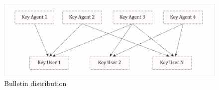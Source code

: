 \begin{figure}[hb]
\centering
\includegraphics[width=1 \linewidth]{images/distribution.png} 
\caption{Bulletin distribution}
\label{fig:distribution}
\end{figure}









